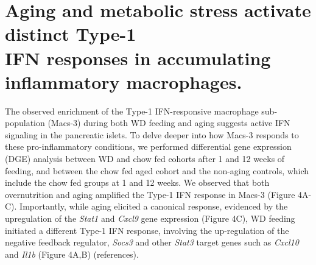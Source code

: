 


\section{Aging and metabolic stress activate distinct Type-1\\IFN responses in accumulating inflammatory macrophages.}
\label{sec:endodiff_overview}
The observed enrichment of the Type-1 IFN-responsive macrophage sub-population (Macs-3) during both WD feeding and aging suggests active IFN signaling in the pancreatic islets. To delve deeper into how Macs-3 responds to these pro-inflammatory conditions, we performed differential gene expression (DGE) analysis between WD and chow fed cohorts after 1 and 12 weeks of feeding, and between the chow fed aged cohort and the non-aging controls, which include the chow fed groups at 1 and 12 weeks. We observed that both overnutrition and aging amplified the Type-1 IFN response in Macs-3 (Figure 4A-C). Importantly, while aging elicited a canonical response, evidenced by the upregulation of the \textit{Stat1} and \textit{Cxcl9} gene expression (Figure 4C), WD feeding initiated a different Type-1 IFN response, involving the up-regulation of the negative feedback regulator, \textit{Socs3} and other \textit{Stat3} target genes such as \textit{Cxcl10} and \textit{Il1b} (Figure 4A,B) (references).

